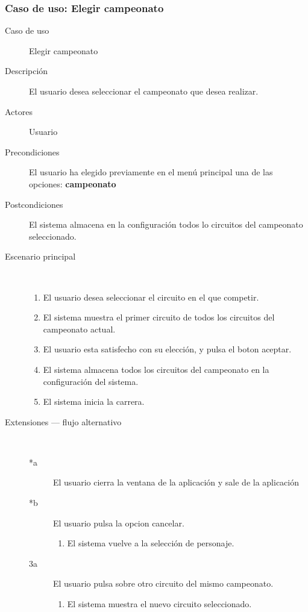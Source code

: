 \subsubsection{Caso de uso: Elegir campeonato}

\begin{description}
    \item[Caso de uso] Elegir campeonato
    \item[Descripción] El usuario desea seleccionar el campeonato que desea realizar.
    \item[Actores] Usuario
    \item[Precondiciones] El usuario ha elegido previamente en el menú principal una de las opciones: \textbf{campeonato}
    \item[Postcondiciones] El sistema almacena en la configuración todos lo circuitos del campeonato seleccionado.
    \item[Escenario principal] $\quad$
        \begin{enumerate}
            \item El usuario desea seleccionar el circuito en el que competir.
            \item El sistema muestra el primer circuito de todos los circuitos del campeonato actual.
            \item El usuario esta satisfecho con su elección, y pulsa el boton aceptar.
            \item El sistema almacena todos los circuitos del campeonato en la configuración del sistema.
            \item El sistema inicia la carrera.
        \end{enumerate}
    \item[Extensiones --- flujo alternativo] $\quad$
        \begin{description}
            \item[*a ] El usuario cierra la ventana de la aplicación y sale de la aplicación
            \item[*b ] El usuario pulsa la opcion cancelar.
            \begin{enumerate}
                \item El sistema vuelve a la selección de personaje.
            \end{enumerate}
            
            \item[3a ] El usuario pulsa sobre otro circuito del mismo campeonato.
            \begin{enumerate}
                \item El sistema muestra el nuevo circuito seleccionado.
            \end{enumerate}
            

\end{description}
\end{description}
